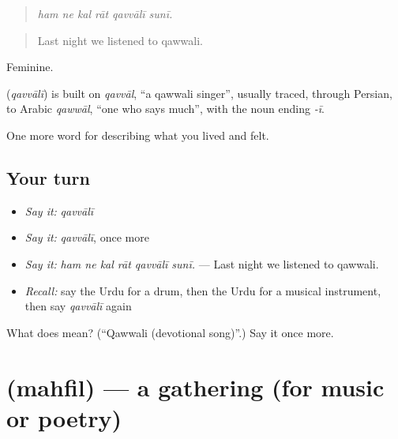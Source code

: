 \begin{quote}
     
\end{quote}

\begin{quote}
\emph{ham ne kal rāt qavvālī sunī.}
\end{quote}

\begin{quote}
Last night we listened to qawwali.
\end{quote}

Feminine.

\begin{cousinweb}
\textbf{} (\emph{qavvālī}) is built on \emph{qavvāl}, \textquotedblleft{}a qawwali singer\textquotedblright{}, usually traced, through Persian, to Arabic \emph{qawwāl}, \textquotedblleft{}one who says much\textquotedblright{}, with the noun ending \emph{-ī}.
\end{cousinweb}

\begin{grammarlens}[title={What you've built}]
One more word for describing what you lived and felt.
\end{grammarlens}

\subsection*{Your turn}
\begin{itemize}
\raggedright
  \item \emph{Say it:} \emph{qavvālī}
  \item \emph{Say it:} \emph{qavvālī}, once more
  \item \emph{Say it:} \emph{ham ne kal rāt qavvālī sunī.} — Last night we listened to qawwali.
  \item \emph{Recall:} say the Urdu for a drum, then the Urdu for a musical instrument, then say \emph{qavvālī} again
\end{itemize}

\begin{tcolorbox}[breakable,colback=teal!4,colframe=teal!35!black,title={Before you move on}]
What does  mean? (\textquotedblleft{}Qawwali (devotional song)\textquotedblright{}.) Say it once more.
\end{tcolorbox}
\section[\texorpdfstring{\ur{محفل} (mahfil)}{محفل (mahfil)}]{ (mahfil) — a gathering (for music or poetry)}

